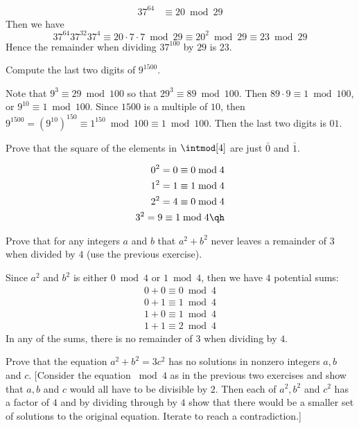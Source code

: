 \begin{problems}
\begin{sol}
\begin{align*}
            37^{64} & \equiv 20 \bmod 29
        \end{align*}
        Then we have
        $$37^{64}37^{32}37^4 \equiv 20 \cdot 7 \cdot 7 \bmod 29 \equiv 20^2 \bmod 29 \equiv 23 \bmod 29$$
        Hence the remainder when dividing $37^{100}$ by $29$ is $23$.
    \end{sol}
    \item Compute the last two digits of $9^{1500}$.
    \begin{sol}
        Note that $9^3 \equiv 29 \bmod 100$ so that $29^3 \equiv 89 \bmod 100$. Then $89 \cdot 9 \equiv 1 \bmod 100$, or $9^{10} \equiv 1 \bmod 100$. Since $1500$ is a multiple of $10$, then $9^{1500} = (9^{10})^{150} \equiv 1^{150} \bmod 100 \equiv 1 \bmod 100$. Then the last two digits is $01$.
    \end{sol}
    \item Prove that the square of the elements in $\intmod[4]$ are just $\bar 0$ and $\bar 1$.
    \begin{sol}
        \begin{align*}
            0^2 = 0 \equiv 0 \bmod 4 \\
            1^2 = 1 \equiv 1 \bmod 4 \\
            2^2 = 4 \equiv 0 \bmod 4 \\
            3^2 = 9 \equiv 1 \bmod 4 \qh
        \end{align*}
    \end{sol}
    \item Prove that for any integers $a$ and $b$ that $a^2 + b^2$ never leaves a remainder of $3$ when divided by $4$ (use the previous exercise).
    \begin{sol}
        Since $a^2 $ and $b^2$ is either $0 \bmod 4$ or $1 \bmod 4$, then we have $4$ potential sums:
        \begin{align*}
            0 + 0 \equiv 0 \bmod 4 \\
            0 + 1 \equiv 1 \bmod 4 \\
            1 + 0 \equiv 1 \bmod 4 \\
            1 + 1 \equiv 2 \bmod 4
        \end{align*}
        In any of the sums, there is no remainder of $3$ when dividing by $4$.
    \end{sol}
    \item Prove that the equation $a^2 + b^2 = 3c^2$ has no solutions in nonzero integers $a, b$ and $c$. [Consider the equation $\bmod 4$ as in the previous two exercises and show that $a, b$ and $c$ would all have to be divisible by $2$. Then each of $a^2, b^2$ and $c^2$ has a factor of $4$ and by dividing through by $4$ show that there would be a smaller set of solutions to the original equation. Iterate to reach a contradiction.]

\end{problems}
